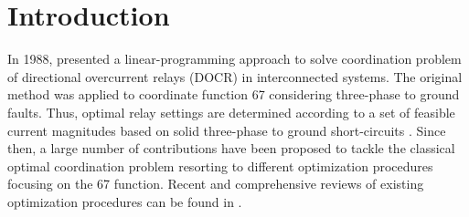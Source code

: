 \documentclass[letterpaper, 10 pt, conference]{IEEEtran}
\begin{document}


\section{Introduction}

In 1988, \cite{urdaneta1988} presented a linear-programming  approach to solve coordination problem of directional overcurrent relays (DOCR) in interconnected systems. The original method was applied to coordinate function 67 considering three-phase to ground faults. Thus, optimal relay settings are determined according to a set of feasible current magnitudes based on solid three-phase to ground short-circuits \cite{ezzeddine2011coordination}. Since then, a large number of contributions have been proposed to tackle the classical optimal coordination problem resorting to different optimization procedures focusing on the 67 function. Recent and comprehensive reviews of existing optimization procedures can be found in \cite{hussain2013optimal, 7753935, emerald, 6880088}.
\end{document}
